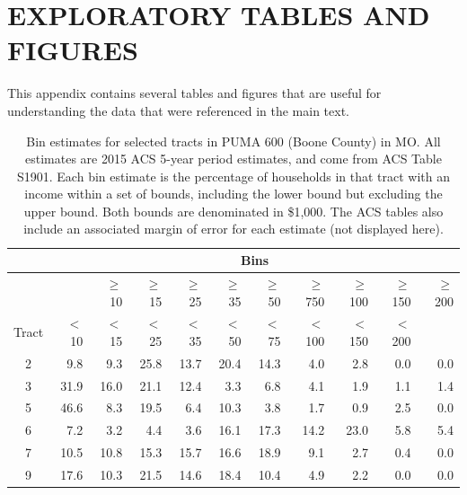 \documentclass[12pt]{article}
\newcommand{\Appendix}
 {%
 \def\thesection{\Alph{section}}
 \def\thesubsection{\Alph{section}.\arabic{subsection}}
 \def\theequation{\Alph{section}.\arabic{equation}}
 \def\thefigure{\Alph{section}.\arabic{figure}}
 \def\thealg{\Alph{section}.\arabic{alg}}
 }
\begin{document}
\newpage

\Appendix

\renewcommand{\thetable}{\Alph{section}.\arabic{table}}
\section{EXPLORATORY TABLES AND FIGURES}\label{app:explore}
\setcounter{table}{0}
This appendix contains several tables and figures that are useful for understanding the data that were referenced in the main text.

\begin{table}[h]
  \centering
  {\footnotesize
    \begin{tabular}{crrrrrrrrrr}
                & \multicolumn{10}{c}{Bins}\\\hline
          &       & $\geq$10 & $\geq$15 & $\geq$25 & $\geq$35 & $\geq$50 & $\geq$750 & $\geq$100 & $\geq$150 & $\geq$200\\
    Tract & $<$10 & $<$15 & $<$25 & $<$35 & $<$50 & $<$75 &$<$100 &$<$150 &$<$200 & \\
    \hline
 2      & 9.8  & 9.3  & 25.8 & 13.7 & 20.4 & 14.3 & 4.0  & 2.8  & 0.0  & 0.0\\
 3      & 31.9 & 16.0 & 21.1 & 12.4 & 3.3  & 6.8  & 4.1  & 1.9  & 1.1  & 1.4 \\
 5      & 46.6 & 8.3  & 19.5 & 6.4  & 10.3 & 3.8  & 1.7  & 0.9  & 2.5  & 0.0 \\
 6      & 7.2  & 3.2  & 4.4  & 3.6  & 16.1 & 17.3 & 14.2 & 23.0 & 5.8  & 5.4 \\
 7      & 10.5 & 10.8 & 15.3 & 15.7 & 16.6 & 18.9 & 9.1  & 2.7  & 0.4  & 0.0 \\
 9      & 17.6 & 10.3 & 21.5 & 14.6 & 18.4 & 10.4 & 4.9  & 2.2  & 0.0  & 0.0 \\
  \end{tabular}
}
\label{tab:acs}
\caption{Bin estimates for selected tracts in PUMA 600 (Boone County) in MO. All estimates are 2015 ACS 5-year period estimates, and come from ACS Table S1901. Each bin estimate is the percentage of households in that tract with an income within a set of bounds, including the lower bound but excluding the upper bound. Both bounds are denominated in \$1,000. The ACS tables also include an associated margin of error for each estimate (not displayed here).}
\end{table}
\end{document}
